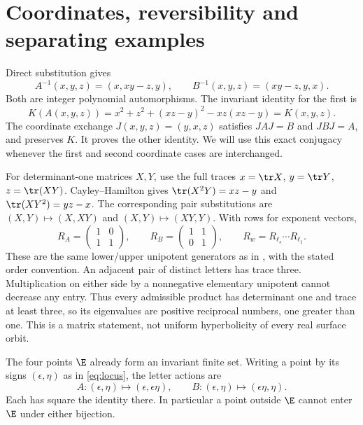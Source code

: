\section{Coordinates, reversibility and separating examples}\label{sec:conventions}

Direct substitution gives
\begin{equation}\label{eq:inverses}
 A^{-1}(x,y,z)=(x,xy-z,y),\qquad
 B^{-1}(x,y,z)=(xy-z,y,x).
\end{equation}
Both are integer polynomial automorphisms. The invariant identity
for the first is
\[
 K(A(x,y,z))=x^2+z^2+(xz-y)^2-xz(xz-y)=K(x,y,z).
\]
The coordinate exchange $J(x,y,z)=(y,x,z)$ satisfies $JAJ=B$
and $JBJ=A$, and preserves $K$. It proves the other identity.
We will use this exact conjugacy whenever the first and second
coordinate cases are interchanged.

For determinant-one matrices $X,Y$, use the full traces
$x=\tr X$, $y=\tr Y$, $z=\tr(XY)$. Cayley--Hamilton gives
$\tr(X^2Y)=xz-y$ and $\tr(XY^2)=yz-x$. The corresponding pair
substitutions are $(X,Y)\mapsto(X,XY)$ and $(X,Y)\mapsto(XY,Y)$.
With rows for exponent vectors,
\begin{equation}\label{eq:matrices}
 R_A=\begin{pmatrix}1&0\\1&1\end{pmatrix},\qquad
 R_B=\begin{pmatrix}1&1\\0&1\end{pmatrix},\qquad
 R_w=R_{\ell_s}\cdots R_{\ell_1}.
\end{equation}
These are the same lower/upper unipotent generators as in
\citet{SasakiYoshida2008}, with the stated order convention.
An adjacent pair of distinct letters has trace three.
Multiplication on either side by a nonnegative elementary
unipotent cannot decrease any entry. Thus every admissible
product has determinant one and trace at least three, so its
eigenvalues are positive reciprocal numbers, one greater than one.
This is a matrix statement, not uniform hyperbolicity of every
real surface orbit.

The four points $\E$ already form an invariant finite set.
Writing a point by its signs $(\epsilon,\eta)$ as in
\eqref{eq:locus}, the letter actions are
\begin{equation}\label{eq:E}
 A:(\epsilon,\eta)\mapsto(\epsilon,\epsilon\eta),\qquad
 B:(\epsilon,\eta)\mapsto(\epsilon\eta,\eta).
\end{equation}
Each has square the identity there. In particular a point outside
$\E$ cannot enter $\E$ under either bijection.

